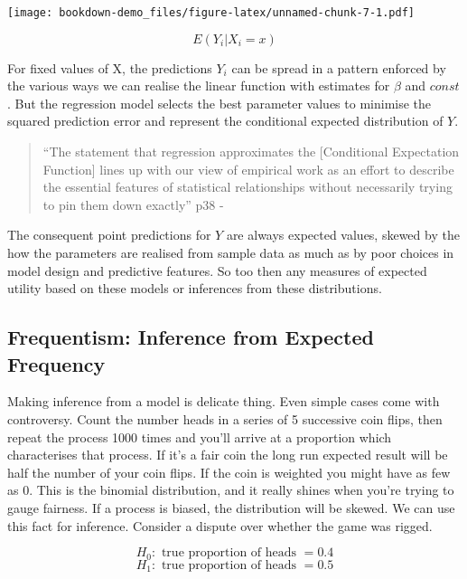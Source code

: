 \documentclass[
]{book}
\theoremstyle{definition}
\theoremstyle{definition}
\theoremstyle{definition}
\theoremstyle{remark}
\begin{document}
\texttt{[image: bookdown-demo\_files/figure-latex/unnamed-chunk-7-1.pdf]}

\[ E(Y_{i} | X_{i} = x )\]

For fixed values of X, the predictions \(Y_{i}\) can be spread in a pattern enforced by the various ways we can realise the linear function with estimates for \(\beta\) and \(const\). But the regression model selects the best parameter values to minimise the squared prediction error and represent the conditional expected distribution of \(Y\).

\begin{quote}
``The statement that regression approximates the {[}Conditional Expectation Function{]} lines up with our view of empirical work as an effort to describe the essential features of statistical relationships without necessarily trying to pin them down exactly'' p38 - \citep{angrist_mostly_2008}
\end{quote}

The consequent point predictions for \(Y\) are always expected values, skewed by the how the parameters are realised from sample data as much as by poor choices in model design and predictive features. So too then any measures of expected utility based on these models or inferences from these distributions.

\hypertarget{frequentism-inference-from-expected-frequency}{%
\subsection{Frequentism: Inference from Expected Frequency}\label{frequentism-inference-from-expected-frequency}}

Making inference from a model is delicate thing. Even simple cases come with controversy. Count the number heads in a series of 5 successive coin flips, then repeat the process 1000 times and you'll arrive at a proportion which characterises that process. If it's a fair coin the long run expected result will be half the number of your coin flips. If the coin is weighted you might have as few as 0. This is the binomial distribution, and it really shines when you're trying to gauge fairness. If a process is biased, the distribution will be skewed. We can use this fact for inference. Consider a dispute over whether the game was rigged.

\[ H_0 : \text{ true proportion of heads } = 0.4  \] \[ H_1 : \text{ true proportion of heads } =  0.5 \]
\end{document}
